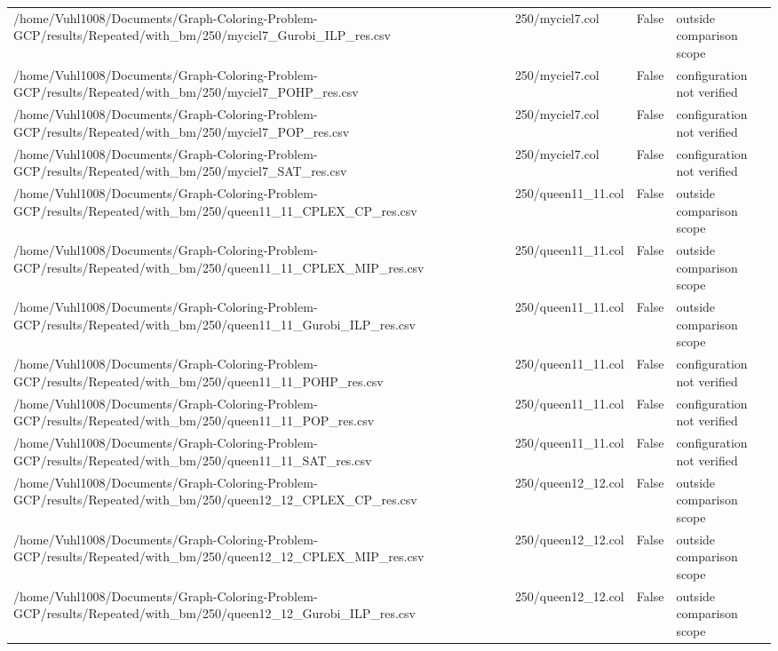 \begin{table}[htbp]
\begin{tabular}{llll}
/home/Vuhl1008/Documents/Graph-Coloring-Problem-GCP/results/Repeated/with\_bm/250/myciel7\_Gurobi\_ILP\_res.csv & 250/myciel7.col & False & outside comparison scope \\
/home/Vuhl1008/Documents/Graph-Coloring-Problem-GCP/results/Repeated/with\_bm/250/myciel7\_POHP\_res.csv & 250/myciel7.col & False & configuration not verified \\
/home/Vuhl1008/Documents/Graph-Coloring-Problem-GCP/results/Repeated/with\_bm/250/myciel7\_POP\_res.csv & 250/myciel7.col & False & configuration not verified \\
/home/Vuhl1008/Documents/Graph-Coloring-Problem-GCP/results/Repeated/with\_bm/250/myciel7\_SAT\_res.csv & 250/myciel7.col & False & configuration not verified \\
/home/Vuhl1008/Documents/Graph-Coloring-Problem-GCP/results/Repeated/with\_bm/250/queen11\_11\_CPLEX\_CP\_res.csv & 250/queen11\_11.col & False & outside comparison scope \\
/home/Vuhl1008/Documents/Graph-Coloring-Problem-GCP/results/Repeated/with\_bm/250/queen11\_11\_CPLEX\_MIP\_res.csv & 250/queen11\_11.col & False & outside comparison scope \\
/home/Vuhl1008/Documents/Graph-Coloring-Problem-GCP/results/Repeated/with\_bm/250/queen11\_11\_Gurobi\_ILP\_res.csv & 250/queen11\_11.col & False & outside comparison scope \\
/home/Vuhl1008/Documents/Graph-Coloring-Problem-GCP/results/Repeated/with\_bm/250/queen11\_11\_POHP\_res.csv & 250/queen11\_11.col & False & configuration not verified \\
/home/Vuhl1008/Documents/Graph-Coloring-Problem-GCP/results/Repeated/with\_bm/250/queen11\_11\_POP\_res.csv & 250/queen11\_11.col & False & configuration not verified \\
/home/Vuhl1008/Documents/Graph-Coloring-Problem-GCP/results/Repeated/with\_bm/250/queen11\_11\_SAT\_res.csv & 250/queen11\_11.col & False & configuration not verified \\
/home/Vuhl1008/Documents/Graph-Coloring-Problem-GCP/results/Repeated/with\_bm/250/queen12\_12\_CPLEX\_CP\_res.csv & 250/queen12\_12.col & False & outside comparison scope \\
/home/Vuhl1008/Documents/Graph-Coloring-Problem-GCP/results/Repeated/with\_bm/250/queen12\_12\_CPLEX\_MIP\_res.csv & 250/queen12\_12.col & False & outside comparison scope \\
/home/Vuhl1008/Documents/Graph-Coloring-Problem-GCP/results/Repeated/with\_bm/250/queen12\_12\_Gurobi\_ILP\_res.csv & 250/queen12\_12.col & False & outside comparison scope \\

\end{tabular}
\end{table}
